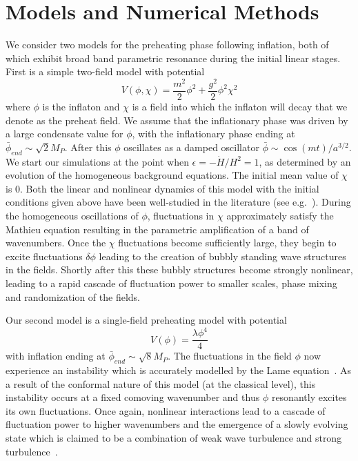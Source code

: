\documentclass[11pt,a4paper]{article}
\begin{document}
\section{Models and Numerical Methods}
\label{sec:models_numerics}
We consider two models for the preheating phase following inflation, both of which exhibit broad band parametric resonance during the initial linear stages.
First is a simple two-field model with potential
\begin{equation}
  V(\phi,\chi) = \frac{m^2}{2}\phi^2 + \frac{g^2}{2}\phi^2\chi^2
  \label{eqn:2field_model}
\end{equation}
where $\phi$ is the inflaton and $\chi$ is a field into which the inflaton will decay that we denote as the preheat field.
We assume that the inflationary phase was driven by a large condensate value for $\phi$, with the inflationary phase ending at $\bar{\phi}_{end} \sim \sqrt{2}M_P$.
After this $\phi$ oscillates as a damped oscillator $\bar{\phi} \sim \cos(mt)/a^{3/2}$.
We start our simulations at the point when $\epsilon = -\dot{H}/H^2 = 1$, as determined by an evolution of the homogeneous background equations.
The initial mean value of $\chi$ is 0.
Both the linear and nonlinear dynamics of this model with the initial conditions given above have been well-studied in the literature (see e.g.~\cite{Kofman:1997yn,Felder:2006cc,Frolov:2008hy,Prokopec:1996rr}).
During the homogeneous oscillations of $\phi$, fluctuations in $\chi$ approximately satisfy the Mathieu equation resulting in the parametric amplification of a band of wavenumbers.
Once the $\chi$ fluctuations become sufficiently large, they begin to excite fluctuations $\delta\phi$ leading to the creation of bubbly standing wave structures in the fields.
Shortly after this these bubbly structures become strongly nonlinear, leading to a rapid cascade of fluctuation power to smaller scales, phase mixing and randomization of the fields.

Our second model is a single-field preheating model with potential
\begin{equation}
  V(\phi) = \frac{\lambda\phi^4}{4} 
  \label{eqn:1field_model}
\end{equation}
with inflation ending at $\bar{\phi}_{end} \sim \sqrt{8}M_P$.
The fluctuations in the field $\phi$ now experience an instability which is accurately modelled by the Lame equation~\cite{Greene:1997fu}.
As a result of the conformal nature of this model (at the classical level), this instability occurs at a fixed comoving wavenumber and thus $\phi$ resonantly excites its own fluctuations.
Once again, nonlinear interactions lead to a cascade of fluctuation power to higher wavenumbers and the emergence of a slowly evolving state which is claimed to be a combination of weak wave turbulence and strong turbulence~\cite{Micha:2002ey,Micha:2004bv,Prokopec:1996rr,Berges:2013lsa,Berges:2010ez}.
\end{document}
